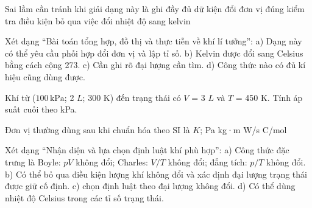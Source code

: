 \begin{ex}
Sai lầm cần tránh khi giải dạng này là
\choice
{ghi đầy đủ dữ kiện}
{đổi đơn vị đúng}
{kiểm tra điều kiện}
{\True bỏ qua việc đổi nhiệt độ sang kelvin}
\end{ex}

\begin{ex}
Xét dạng “Bài toán tổng hợp, đồ thị và thực tiễn về khí lí tưởng”: a) Dạng này có thể yêu cầu phối hợp đổi đơn vị và lập tỉ số. b) Kelvin được đổi sang Celsius bằng cách cộng 273. c) Cần ghi rõ đại lượng cần tìm. d) Công thức nào có đủ kí hiệu cũng dùng được.
\choiceTF

\end{ex}

\begin{ex}
Khí từ ($100\,\text{kPa}$; 2 $L$; 300 K) đến trạng thái có $V$ = 3 $L$ và $T$ = 450 K. Tính áp suất cuối theo kPa.
\end{ex}

\begin{ex}
Đơn vị thường dùng sau khi chuẩn hóa theo SI là
\choice
{\True $K$; Pa}
{kg·m}
{W/s}
{C/mol}
\end{ex}

\begin{ex}
Xét dạng “Nhận diện và lựa chọn định luật khí phù hợp”: a) Công thức đặc trưng là Boyle: $pV$ không đổi; Charles: $V/T$ không đổi; đẳng tích: $p/T$ không đổi. b) Có thể bỏ qua điều kiện lượng khí không đổi và xác định đại lượng trạng thái được giữ cố định. c) chọn định luật theo đại lượng không đổi. d) Có thể dùng nhiệt độ Celsius trong các tỉ số trạng thái.
\choiceTF

\end{ex}

